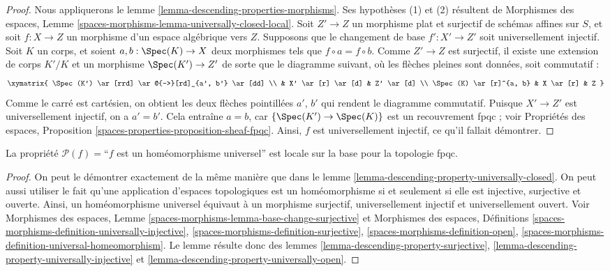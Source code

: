 \begin{proof}
Nous appliquerons le
lemme \ref{lemma-descending-properties-morphisms}.
Ses hypothèses (1) et (2) résultent de
Morphismes des espaces,
Lemme \ref{spaces-morphisms-lemma-universally-closed-local}.
Soit $Z' \to Z$ un morphisme plat et surjectif de schémas affines
sur $S$, et soit $f : X \to Z$ un morphisme d'un espace algébrique vers $Z$.
Supposons que le changement de base $f' : X' \to Z'$ soit universellement injectif.
Soit $K$ un corps, et soient $a, b : \Spec(K) \to X$
deux morphismes tels que $f \circ a = f \circ b$.
Comme $Z' \to Z$ est surjectif, il existe une extension de corps
$K'/K$ et un morphisme
$\Spec(K') \to Z'$
de sorte que le diagramme suivant, où les flèches pleines sont données, soit commutatif :
$$
\xymatrix{
\Spec(K') \ar[rrd] \ar@{-->}[rd]_{a', b'} \ar[dd] \\
 &
X' \ar[r] \ar[d] &
Z' \ar[d] \\
\Spec(K) \ar[r]^{a, b} &
X \ar[r] &
Z
}
$$
Comme le carré est cartésien, on obtient les deux flèches pointillées $a'$, $b'$ qui rendent le
diagramme commutatif. Puisque $X' \to Z'$ est universellement injectif, on a $a' = b'$.
Cela entraîne $a = b$, car $\{\Spec(K') \to \Spec(K)\}$
est un recouvrement fpqc ; voir
Propriétés des espaces, Proposition
\ref{spaces-properties-proposition-sheaf-fpqc}.
Ainsi, $f$ est universellement injectif, ce qu'il fallait démontrer.
\end{proof}

\begin{lemma}
\label{lemma-descending-property-universal-homeomorphism}
La propriété $\mathcal{P}(f) =$``$f$ est un homéomorphisme universel''
est locale sur la base pour la topologie fpqc.
\end{lemma}

\begin{proof}
On peut le démontrer exactement de la même manière que dans le
lemme \ref{lemma-descending-property-universally-closed}.
On peut aussi utiliser le fait qu'une application d'espaces topologiques est un
homéomorphisme si et seulement si elle est injective, surjective et ouverte.
Ainsi, un homéomorphisme universel équivaut à un morphisme
surjectif, universellement injectif et universellement ouvert.
Voir Morphismes des espaces, Lemme
\ref{spaces-morphisms-lemma-base-change-surjective} et
Morphismes des espaces, Définitions
\ref{spaces-morphisms-definition-universally-injective},
\ref{spaces-morphisms-definition-surjective},
\ref{spaces-morphisms-definition-open},
\ref{spaces-morphisms-definition-universal-homeomorphism}.
Le lemme résulte donc des
lemmes \ref{lemma-descending-property-surjective},
\ref{lemma-descending-property-universally-injective} et
\ref{lemma-descending-property-universally-open}.
\end{proof}

